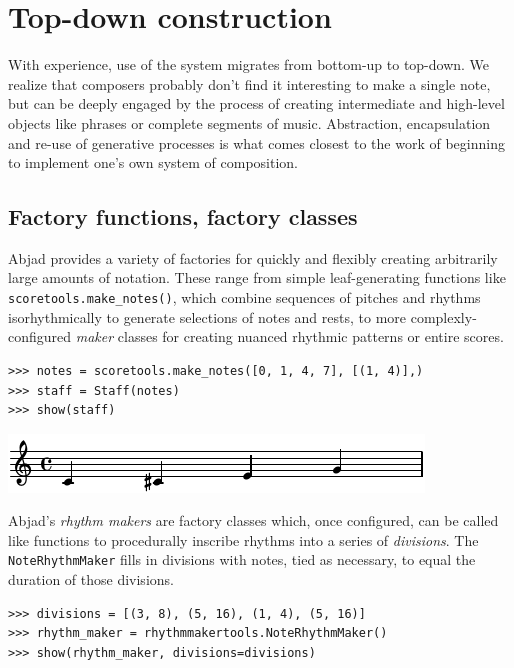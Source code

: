 \documentclass{article}
\begin{document}
\section{Top-down construction} \label{sec:top-down}

With experience, use of the system migrates from bottom-up to top-down. We
realize that composers probably don't find it interesting to make a single
note, but can be deeply engaged by the process of creating intermediate and
high-level objects like phrases or complete segments of music. Abstraction,
encapsulation and re-use of generative processes is what comes closest to the
work of beginning to implement one's own system of composition.

\subsection{Factory functions, factory classes}

Abjad provides a variety of factories for quickly and flexibly creating
arbitrarily large amounts of notation. These range from simple leaf-generating
functions like \texttt{scoretools.make\_notes()}, which combine sequences of
pitches and rhythms isorhythmically to generate selections of notes and rests,
to more complexly-configured \emph{maker} classes for creating nuanced rhythmic
patterns or entire scores.

\begin{lstlisting}
>>> notes = scoretools.make_notes([0, 1, 4, 7], [(1, 4)],)
>>> staff = Staff(notes)
>>> show(staff)
\end{lstlisting}

\noindent\includegraphics[scale=1.0]{images/abjad-3.pdf}


Abjad's \emph{rhythm makers} are factory classes which, once configured, can be
called like functions to procedurally inscribe rhythms into a series of
\emph{divisions}. The \texttt{NoteRhythmMaker} fills in divisions with notes,
tied as necessary, to equal the duration of those divisions.

\begin{lstlisting}
>>> divisions = [(3, 8), (5, 16), (1, 4), (5, 16)]
>>> rhythm_maker = rhythmmakertools.NoteRhythmMaker()
>>> show(rhythm_maker, divisions=divisions)
\end{lstlisting}
\end{document}
